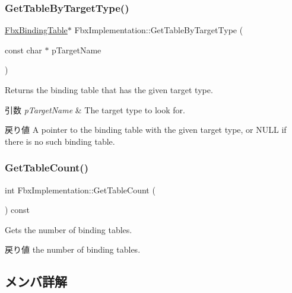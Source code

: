 \subsubsection{\texorpdfstring{Get\+Table\+By\+Target\+Type()}{GetTableByTargetType()}\hspace{0.1cm}{\footnotesize\ttfamily [2/2]}}
{\footnotesize\ttfamily \hyperlink{class_fbx_binding_table}{Fbx\+Binding\+Table}$\ast$ Fbx\+Implementation\+::\+Get\+Table\+By\+Target\+Type (\begin{DoxyParamCaption}\item[{const char $\ast$}]{p\+Target\+Name }\end{DoxyParamCaption})}

Returns the binding table that has the given target type. 
\begin{DoxyParams}{引数}
{\em p\+Target\+Name} & The target type to look for. \\
\hline
\end{DoxyParams}
\begin{DoxyReturn}{戻り値}
A pointer to the binding table with the given target type, or N\+U\+LL if there is no such binding table. 
\end{DoxyReturn}
\mbox{\label{class_fbx_implementation_a36f67aeee13d4cc5d1523b9c36a44a50}} 
\subsubsection{\texorpdfstring{Get\+Table\+Count()}{GetTableCount()}}
{\footnotesize\ttfamily int Fbx\+Implementation\+::\+Get\+Table\+Count (\begin{DoxyParamCaption}{ }\end{DoxyParamCaption}) const}

Gets the number of binding tables. \begin{DoxyReturn}{戻り値}
the number of binding tables. 
\end{DoxyReturn}


\subsection{メンバ詳解}
\mbox{\label{class_fbx_implementation_acda7f6c31ffe13c69bd3dbfa972a6fac}} 
